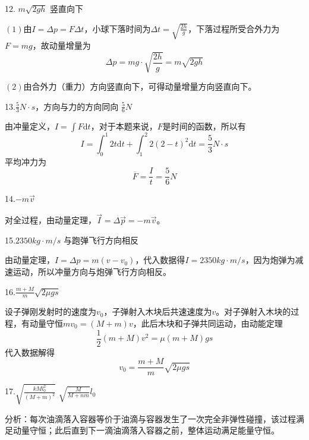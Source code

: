 \documentclass[blue, normal]{./templete/qyxfnote}
\newcommand{\di}[1]{\mathrm{d}#1}
\begin{document}
\begin{multicols}{2}
			12. $ m\sqrt{2gh} $ \hspace{4em} 竖直向下
			
			$(1)$由$ I=\Delta p=F\Delta t $，小球下落时间为$\Delta t=\sqrt{\frac{2h}{g}}$，下落过程所受合外力为$F=mg$，故动量增量为
			\begin{equation*}
			\Delta p=mg\cdot\sqrt{\frac{2h}{g}}=m\sqrt{2gh}
			\end{equation*}
			
			$(2)$由合外力（重力）方向竖直向下，可得动量增量方向竖直向下。
			
			13.$\frac{5}{3}N\cdot s$，方向与力的方向同向 \hspace{2em} $\frac{5}{6}N$
			
			由冲量定义，$I = \int F \di t$，对于本题来说，$F$是时间的函数，所以有
			\begin{equation*}
			I = \int_0^1 2t \di t + \int_1^2 2(2-t)^2 \di t = \frac{5}{3}N \cdot s
			\end{equation*}
			平均冲力为
			\begin{equation*}
			\overline{F} = \frac{I}{t} = \frac{5}{6} N
			\end{equation*}
			
			14.$-m\vec{v}$
			
			对全过程，由动量定理，$\vec{I} = \Delta \vec{p} = -m\vec{v}$。
			
			15.$2350kg\cdot m/s$ \hspace{2em} 与跑弹飞行方向相反
			
			由动量定理，$I = \Delta p = m(v-v_0)$，代入数据得$I=2350kg\cdot m/s$，因为炮弹为减速运动，所以冲量方向与炮弹飞行方向相反。
			
			16.$\frac{m+M}{m}\sqrt{2 \mu gs}$
			
			设子弹刚发射时的速度为$v_0$，子弹射入木块后共速速度为$v$。对子弹射入木块的过程，有动量守恒$mv_0=(M+m)v$，此后木块和子弹共同运动，由动能定理
			\begin{equation*}
			\frac{1}{2}(m+M)v^2=\mu (m+M)gs
			\end{equation*}
			代入数据解得
			\begin{equation*}
			v_0=\frac{m+M}{m}\sqrt{2 \mu gs}
			\end{equation*}
			
			17.$\sqrt{\frac{kMl_0^2}{(M+m)^2}}$ \hspace{4em} $\sqrt{\frac{M}{M+nm}}l_0$
			
			分析：每次油滴落入容器等价于油滴与容器发生了一次完全非弹性碰撞，该过程满足动量守恒；此后直到下一滴油滴落入容器之前，整体运动满足能量守恒。
			

\end{multicols}
\end{document}
